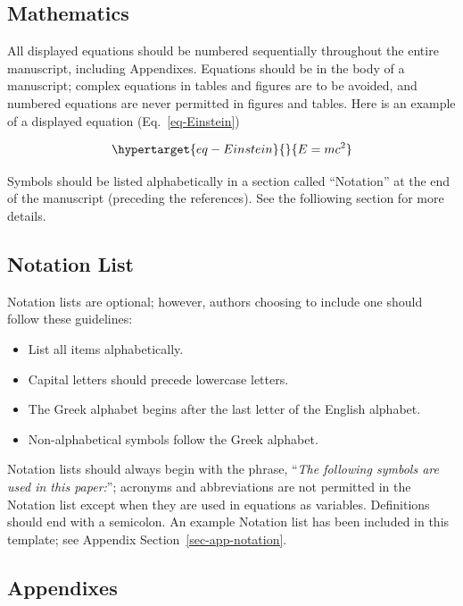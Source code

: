 \documentclass[
  NewProceedings,
  letterpaper]{./assets/ascelike-new}
\begin{document}
\hypertarget{mathematics}{%
\subsection{Mathematics}\label{mathematics}}

All displayed equations should be numbered sequentially throughout the
entire manuscript, including Appendixes. Equations should be in the body
of a manuscript; complex equations in tables and figures are to be
avoided, and numbered equations are never permitted in figures and
tables. Here is an example of a displayed equation
(Eq.~\ref{eq-Einstein})

\begin{equation}\protect\hypertarget{eq-Einstein}{}{
E = m c^{2}
}\label{eq-Einstein}\end{equation}

Symbols should be listed alphabetically in a section called ``Notation''
at the end of the manuscript (preceding the references). See the
folliowing section for more details.

\hypertarget{notation-list}{%
\subsection{Notation List}\label{notation-list}}

Notation lists are optional; however, authors choosing to include one
should follow these guidelines:

\begin{itemize}
\item
  List all items alphabetically.
\item
  Capital letters should precede lowercase letters.
\item
  The Greek alphabet begins after the last letter of the English
  alphabet.
\item
  Non-alphabetical symbols follow the Greek alphabet.
\end{itemize}

Notation lists should always begin with the phrase, ``\emph{The
following symbols are used in this paper:}''; acronyms and abbreviations
are not permitted in the Notation list except when they are used in
equations as variables. Definitions should end with a semicolon. An
example Notation list has been included in this template; see Appendix
Section~\ref{sec-app-notation}.

\hypertarget{appendixes}{%
\subsection{Appendixes}\label{appendixes}}
\end{document}

